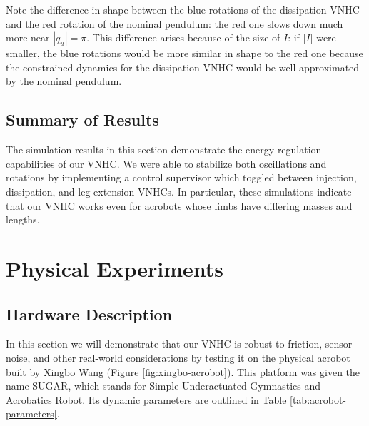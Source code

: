 \documentclass[journal,twoside,web]{ieeecolor}
\begin{document}
{Note the difference in shape between the blue rotations of the dissipation VNHC
and the red rotation of the nominal pendulum: the red one slows down much more
near \(|q_u| = \pi\).
This difference arises because of the size of \(I\):
if \(|I|\) were smaller, the blue rotations would be more similar in shape to the
red one because the constrained dynamics for the dissipation VNHC would be
well approximated by the nominal pendulum.

\subsection{Summary of Results}
The simulation results in this section demonstrate the energy regulation
capabilities of our VNHC.  
We were able to stabilize both oscillations and rotations by implementing a
control supervisor which toggled between injection, dissipation, and
leg-extension VNHCs.
In particular, these simulations indicate that our VNHC
works even for acrobots whose limbs have differing masses and lengths.

\section{Physical Experiments}\label{sec:experiments}

\subsection{Hardware Description}
In this section we will demonstrate that our VNHC is robust to friction, sensor
noise, and other real-world considerations by testing it on the physical
acrobot built by Xingbo Wang \cite{xingbo_thesis} 
(Figure \ref{fig:xingbo-acrobot}).
This platform was given the name SUGAR, which stands for
Simple Underactuated Gymnastics and Acrobatics Robot.
Its dynamic parameters are outlined in Table \ref{tab:acrobot-parameters}.


}
\end{document}
